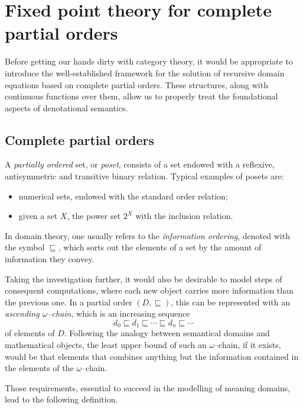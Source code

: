\section[Fixed point theory for cpos]%
{Fixed point theory for complete partial orders}

Before getting our hands dirty with category theory, it would be appropriate to
introduce the well-established framework for the solution of recursive domain
equations based on complete partial orders.
These structures, along with continuous functions over them, allow us to properly treat the foundational aspects of denotational semantics.

\subsection[Complete partial orders]{Complete partial orders}

A \emph{partially ordered} set, or \emph{poset}, consists of a set endowed with a reflexive, antisymmetric and transitive binary relation.
Typical examples of posets are:
\begin{itemize}
  \item numerical sets, endowed with the standard order relation;
  \item given a set \(X\), the power set \(2^X\) with the inclusion relation.
\end{itemize}
In domain theory, one usually refers to the \emph{information ordering}, denoted with the symbol \({}\sqsubseteq{}\), which sorts out the elements of a set by the amount of information they convey.

Taking the investigation further, it would also be desirable to model steps of consequent computations, where each new object carries more information than the previous one.
In a partial order \((D, {}\sqsubseteq)\), this can be represented with an
\emph{ascending \(\omega\)--chain}, which is an increasing sequence
\begin{equation*}
  d_0 \sqsubseteq d_1 \sqsubseteq \dotsb \sqsubseteq d_n \sqsubseteq \dotsb{}
\end{equation*}
of elements of \(D\).
Following the analogy between semantical domains and mathematical objects, the least upper bound of such an \(\omega\)--chain, if it exists, would be that elements that combines anything but the information contained in the elements of the \(\omega\)--chain.

Those requirements, essential to succeed in the modelling of meaning domains, lead to the following definition.


